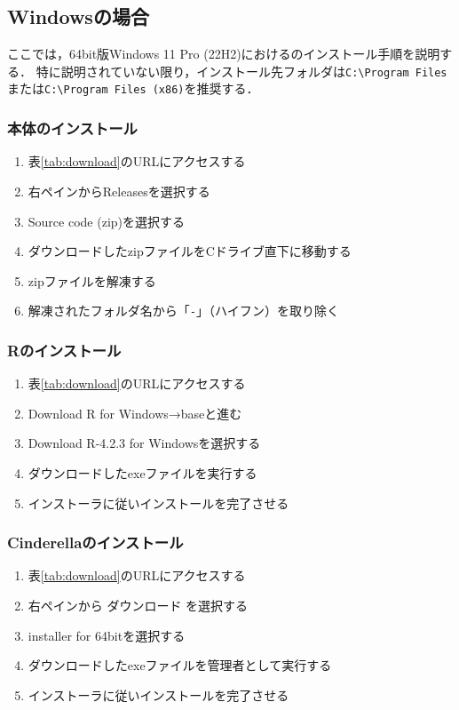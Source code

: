 \subsection{Windowsの場合}

ここでは，64bit版Windows 11 Pro (22H2)における{\ketcindy}のインストール手順を説明する．
特に説明されていない限り，インストール先フォルダは\verb|C:\Program Files|または\verb|C:\Program Files (x86)|を推奨する．

\subsubsection{{\ketcindy}本体のインストール}
\begin{enumerate}
    \item 表\ref{tab:download}のURLにアクセスする
    \item 右ペインからReleasesを選択する
    \item Source code (zip)を選択する
    \item ダウンロードしたzipファイルをCドライブ直下に移動する
    \item zipファイルを解凍する
    \item 解凍されたフォルダ名から「\verb|-|」（ハイフン）を取り除く
\end{enumerate}

\subsubsection{Rのインストール}
\begin{enumerate}
    \item 表\ref{tab:download}のURLにアクセスする
    \item Download R for Windows→baseと進む
    \item Download R-4.2.3 for Windowsを選択する
    \item ダウンロードしたexeファイルを実行する
    \item インストーラに従いインストールを完了させる
\end{enumerate}

\subsubsection{Cinderellaのインストール}
\begin{enumerate}
    \item 表\ref{tab:download}のURLにアクセスする
    \item 右ペインから ダウンロード を選択する
    \item installer for 64bitを選択する
    \item ダウンロードしたexeファイルを管理者として実行する
    \item インストーラに従いインストールを完了させる
\end{enumerate}

